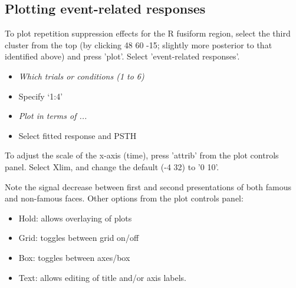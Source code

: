 \subsection{Plotting event-related responses}

To plot repetition suppression effects for the R fusiform region, select the third cluster from the top (by clicking 48 60 -15; slightly more posterior to that identified above) and press 'plot'. Select  'event-related responses'.

\begin{itemize}
\item{\em Which trials or conditions (1 to 6)}
\item{Specify `1:4'}
\item{\em Plot in terms of ...}
\item{Select fitted response and PSTH}
\end{itemize}

To adjust the scale of the x-axis (time), press 'attrib' from the plot controls panel. Select Xlim, and change the default (-4 32) to '0 10'.

Note the signal decrease between first and second presentations of both famous and non-famous faces. Other options from the plot controls panel:

\begin{itemize}
\item{Hold: allows overlaying of plots}
\item{Grid: toggles between grid on/off}
\item{Box: toggles between axes/box}
\item{Text: allows editing of title and/or axis labels.}
\end{itemize}
